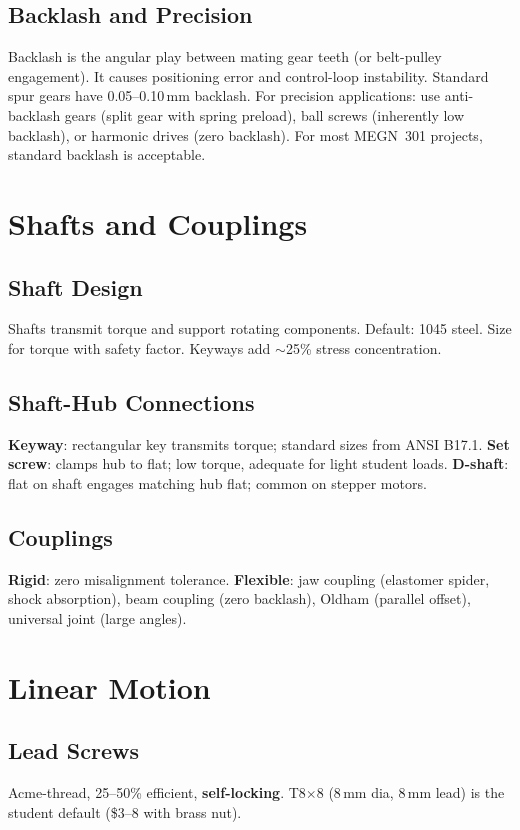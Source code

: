 \documentclass[11pt,letterpaper,twoside,openany]{book}
\begin{document}
\subsection{Backlash and Precision}
Backlash is the angular play between mating gear teeth (or belt-pulley engagement). It causes positioning error and control-loop instability. Standard spur gears have 0.05--0.10\,mm backlash. For precision applications: use anti-backlash gears (split gear with spring preload), ball screws (inherently low backlash), or harmonic drives (zero backlash). For most MEGN~301 projects, standard backlash is acceptable.

\section{Shafts and Couplings}
\subsection{Shaft Design}
Shafts transmit torque and support rotating components. Default: 1045 steel. Size for torque with safety factor. Keyways add $\sim$25\% stress concentration.

\subsection{Shaft-Hub Connections}
\textbf{Keyway}: rectangular key transmits torque; standard sizes from ANSI B17.1. \textbf{Set screw}: clamps hub to flat; low torque, adequate for light student loads. \textbf{D-shaft}: flat on shaft engages matching hub flat; common on stepper motors.

\subsection{Couplings}
\textbf{Rigid}: zero misalignment tolerance. \textbf{Flexible}: jaw coupling (elastomer spider, shock absorption), beam coupling (zero backlash), Oldham (parallel offset), universal joint (large angles).

\section{Linear Motion}
\subsection{Lead Screws}
Acme-thread, 25--50\% efficient, \textbf{self-locking}. T8$\times$8 (8\,mm dia, 8\,mm lead) is the student default (\$3--8 with brass nut).
\end{document}
